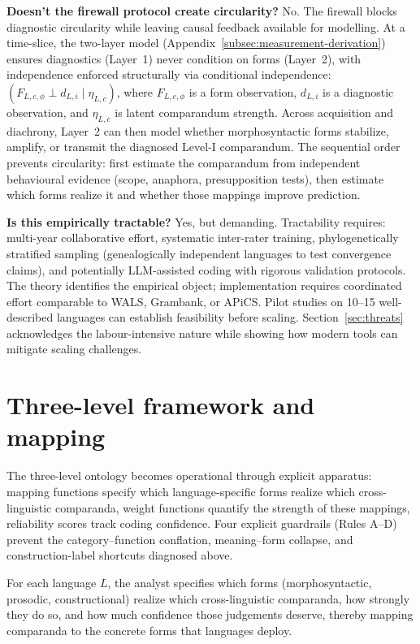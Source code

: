 \documentclass[12pt]{article}
\begin{document}
\textbf{Doesn't the firewall protocol create circularity?} No. The firewall blocks diagnostic circularity while leaving causal feedback available for modelling. At a time-slice, the two-layer model (Appendix~\ref{subsec:measurement-derivation}) ensures diagnostics (Layer~1) never condition on forms (Layer~2), with independence enforced structurally via conditional independence: $(F_{L,c,\phi} \perp d_{L,i} \mid \eta_{L,c})$, where $F_{L,c,\phi}$ is a form observation, $d_{L,i}$ is a diagnostic observation, and $\eta_{L,c}$ is latent comparandum strength. Across acquisition and diachrony, Layer~2 can then model whether morphosyntactic forms stabilize, amplify, or transmit the diagnosed Level-I comparandum. The sequential order prevents circularity: first estimate the comparandum from independent behavioural evidence (scope, anaphora, presupposition tests), then estimate which forms realize it and whether those mappings improve prediction.

\textbf{Is this empirically tractable?} Yes, but demanding. Tractability requires: multi-year collaborative effort, systematic inter-rater training, phylogenetically stratified sampling (genealogically independent languages to test convergence claims), and potentially LLM-assisted coding with rigorous validation protocols. The theory identifies the empirical object; implementation requires coordinated effort comparable to WALS, Grambank, or APiCS. Pilot studies on 10--15 well-described languages can establish feasibility before scaling. Section~\ref{sec:threats} acknowledges the labour-intensive nature while showing how modern tools can mitigate scaling challenges.

\section{Three-level framework and mapping}\label{sec:matrix}
The three-level ontology becomes operational through explicit apparatus: mapping functions specify which language-specific forms realize which cross-linguistic comparanda, weight functions quantify the strength of these mappings, reliability scores track coding confidence. Four explicit guardrails (Rules A--D) prevent the category--function conflation, meaning--form collapse, and construction-label shortcuts diagnosed above.

For each language $L$, the analyst specifies which forms (morphosyntactic, prosodic, constructional) realize which cross-linguistic comparanda, how strongly they do so, and how much confidence those judgements deserve, thereby mapping comparanda to the concrete forms that languages deploy.
\end{document}
